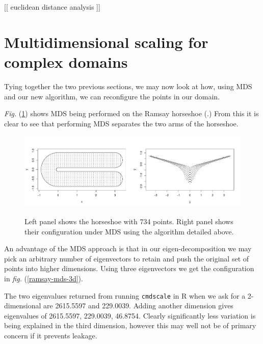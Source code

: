 \documentclass[a4paper,10pt]{amsart}
\newcommand{\fig}[1]{\emph{fig.} (\ref{#1})}
\newcommand{\Fig}[1]{\emph{Fig.} (\ref{#1})}
\begin{document}
[[ euclidean distance analysis ]]


\section{Multidimensional scaling for complex domains}

Tying together the two previous sections, we may now look at how, using MDS and our new algorithm, we can reconfigure the points in our domain.

\Fig{ramsay-mds} shows MDS being performed on the Ramsay horseshoe (\cite{ramsay}.) From this it is clear to see that performing MDS separates the two arms of the horseshoe.

\begin{figure}
\centering
\includegraphics[trim=0in 0.5in 0in 0.25in, width=5.5in]{figs/ramsay-mds.pdf} \\
\caption{Left panel shows the horseshoe with 734 points. Right panel shows their configuration under MDS using the algorithm detailed above.}
\label{ramsay-mds}
\end{figure}

An advantage of the MDS approach is that in our eigen-decomposition we may pick an arbitrary number of eigenvectors to retain and push the original set of points into higher dimensions. Using three eigenvectors we get the configuration in \fig{ramsay-mds-3d}.

The two eigenvalues returned from running \texttt{cmdscale} in \textsf{R} when we ask for a 2-dimensional are 2615.5597 and 229.0039. Adding another dimension gives eigenvalues of 2615.5597, 229.0039, 46.8754. Clearly significantly less variation is being explained in the third dimension, however this may well not be of primary concern if it prevents leakage.
\end{document}
